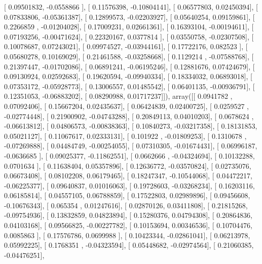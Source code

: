 \documentclass{article}
\begin{document}
       [ 0.09501832, -0.0558866 ],
       [ 0.11576398, -0.10804141],
       [ 0.06577803,  0.02450394],
       [ 0.07833806, -0.05361387],
       [ 0.12899573, -0.02203927],
       [ 0.05640254,  0.09159861],
       [ 0.2266859 , -0.01204028],
       [ 0.17009231,  0.02661361],
       [ 0.16393104, -0.00194611],
       [ 0.07193256, -0.00471624],
       [ 0.22320167,  0.0377814 ],
       [ 0.03550758, -0.02307508],
       [ 0.10078687,  0.07243021],
       [ 0.09974527, -0.03944161],
       [ 0.17722176,  0.082523  ],
       [ 0.05680278,  0.10169029],
       [ 0.21461588, -0.03258668],
       [ 0.1129214 , -0.07588768],
       [ 0.21397447, -0.01702086],
       [ 0.06891241, -0.06195246],
       [ 0.12881676,  0.07424679],
       [ 0.09130924,  0.02592683],
       [ 0.19620594, -0.09940334],
       [ 0.18334032,  0.06893018],
       [ 0.07353172, -0.05928773],
       [ 0.13006557,  0.01485542],
       [ 0.06401135, -0.00936791],
       [ 0.12351053, -0.06883202],
       [ 0.08290988,  0.01717237]]), array([[ 0.0941782 ,  0.07092406],
       [ 0.15667204,  0.02435637],
       [ 0.06424839,  0.02400725],
       [ 0.0259527 , -0.02774448],
       [ 0.21900902, -0.04743288],
       [ 0.20849113,  0.04010203],
       [ 0.0678624 , -0.06613812],
       [ 0.04806573, -0.00838363],
       [ 0.10840273, -0.03217358],
       [ 0.18131853,  0.05021127],
       [ 0.11067617,  0.02333131],
       [ 0.101922  , -0.01809253],
       [ 0.1310678 , -0.07269888],
       [ 0.04484749, -0.00254055],
       [ 0.07310305, -0.01674431],
       [ 0.06996187, -0.0636685 ],
       [ 0.09025377, -0.11862551],
       [ 0.0662666 , -0.04324694],
       [ 0.10132288,  0.0701634 ],
       [ 0.11638404,  0.05357896],
       [ 0.12636772, -0.03570824],
       [ 0.02735076,  0.06673408],
       [ 0.08102208,  0.06179465],
       [ 0.18247347, -0.10544068],
       [ 0.04472217, -0.06225377],
       [ 0.09640837,  0.01016063],
       [ 0.19728603, -0.03268234],
       [ 0.16203116,  0.06185814],
       [ 0.04557105,  0.06788859],
       [ 0.17522803,  0.02989896],
       [ 0.09456608, -0.10676343],
       [ 0.065354  ,  0.01247616],
       [ 0.02870126,  0.03411808],
       [ 0.21815268, -0.09754936],
       [ 0.13832859,  0.04823894],
       [ 0.15280376,  0.04794308],
       [ 0.20864836,  0.04103168],
       [ 0.09566825, -0.00227782],
       [ 0.10153694,  0.00346536],
       [ 0.10704476,  0.0085863 ],
       [ 0.17576786,  0.0699988 ],
       [ 0.10423344, -0.02861041],
       [ 0.06213978,  0.05992225],
       [ 0.1768351 , -0.04323594],
       [ 0.05448682, -0.02974564],
       [ 0.21060385, -0.04476251],
\end{document}
